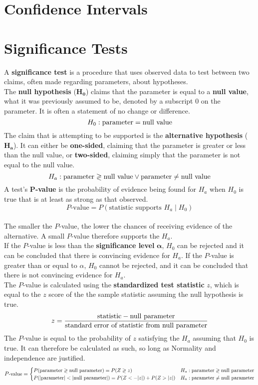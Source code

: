\documentclass[../AP_Statistics.tex]{subfiles}
\begin{document}
	\chapter{Confidence Intervals}
	\chapter{Significance Tests}
		A \textbf{significance test} is a procedure that uses observed data to test between two claims, often made regarding parameters, about hypotheses. \\
		The \textbf{null hypothesis} ($\pmb{H_0}$) claims that the parameter is equal to a \textbf{null value}, what it was previously assumed to be, denoted by a subscript $0$ on the parameter. It is often a statement of no change or difference.
		$$H_0:\rm{parameter} = \text{null value}$$
		The claim that is attempting to be supported is the \textbf{alternative hypothesis} ($\pmb{H_a}$). It can either be \textbf{one-sided}, claiming that the parameter is greater or less than the null value, or \textbf{two-sided}, claiming simply that the parameter is not equal to the null value.
		$$H_a:\rm{parameter} \gtrless \text{null value} \lor \rm{parameter} \ne \text{null value}$$
		A test's $\pmb{P}$\textbf{-value} is the probability of evidence being found for $H_a$ when $H_0$ is true that is at least as strong as that observed.
		$$P\text{-value} = P(\text{statistic supports } H_a \mid H_0)$$ \\
		The smaller the $P$-value, the lower the chances of receiving evidence of the alternative. A small $P$-value therefore supports the $H_a$. \\
		If the $P$-value is less than the \textbf{significance level} $\pmb{\alpha}$, $H_0$ can be rejected and it can be concluded that there is convincing evidence for $H_a$. If the $P$-value is greater than or equal to $\alpha$, $H_0$ cannot be rejected, and it can be concluded that there is not convincing evidence for $H_a$. \\
		The $P$-value is calculated using the \textbf{standardized test statistic} $z$, which is equal to the $z$ score of the the sample statistic assuming the null hypothesis is true.
		$$z = \frac{\text{statistic} - \text{null parameter}}{\text{standard error of statistic from null parameter}}$$
		The $P$-value is equal to the probability of $z$ satisfying the $H_a$ assuming that $H_0$ is true. It can therefore be calculated as such, so long as Normality and independence are justified.
		$$\small
			P\text{-value} = \begin{cases}
				P(\text{parameter} \gtrless \text{null parameter}) = P(Z \gtrless z) & H_a:\text{parameter} \gtrless \text{null parameter} \\
				P(|\text{parameter}| < |\text{null parameter}|) = P(Z < -|z|) + P(Z > |z|) & H_a:\text{parameter} \ne \text{null parameter}
			\end{cases}
		$$
\end{document}
